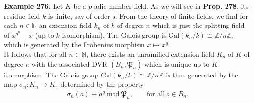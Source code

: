 \documentclass[12pt,a4paper,footinclude=true,headinclude=true]{scrbook} %
\newenvironment{example}[2][Example]
    { \begin{mdframed}[backgroundcolor=gray!20] \textbf{#1 #2.} }
    {  \end{mdframed}}
\begin{document}
\newpage
\begin{example}{276}
    Let $K$ be a $p$-adic number field. As we will see in \textbf{Prop. 278}, its residue field $k$ is finite, say of order $q$. From the theory of finite fields, we find for each $n\in\mathbb{N}$ an extension field $k_n$ of $k$ of degree $n$ which is just the splitting field of $x^{q^n}-x$ (up to $k$-isomorphism). The Galois group is $\mathrm{Gal}(k_n/k)\cong\mathbb{Z}/n\mathbb{Z}$, which is generated by the Frobenius morphism $x\mapsto x^q$.\\ It follows that for all $n\in\mathbb{N}$, there exists an unramified extension field $K_n$ of $K$ of degree $n$ with the associated DVR $(B_n,\mathfrak{P}_n)$ which is unique up to $K$-isomorphism. The Galois group $\mathrm{Gal}(k_n/k)\cong\mathbb{Z}/n\mathbb{Z}$ is thus generated by the map $\sigma_n:K_n\to K_n$ determined by the property
    \begin{align*}
        \sigma_n(a)\equiv a^q\ \mathrm{mod}\ \mathfrak{P}_n,\qquad\text{for all}\ a\in B_n.
    \end{align*}
\end{example}
\end{document}
